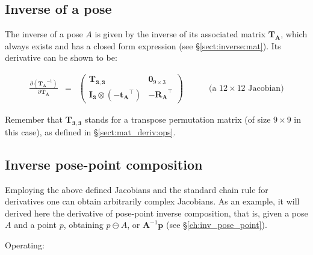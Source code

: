 \documentclass[a4paper,11pt]{report}
\begin{document}
\subsection{Inverse of a pose}

The inverse of a pose $A$ is given by the inverse of its associated matrix $\mathbf{T_A}$,
which always exists and has a closed form expression (see \S\ref{sect:inverse:mat}).
Its derivative can be shown to be:

\begin{eqnarray}
\label{eq:jac_dInv_A}
\frac{\partial \left( \mathbf{T_A} ^{-1} \right) }{\partial \mathbf{T_A} } &=&
\left(
\begin{array}{cc}
 \mathbf{T_{3,3}} & \mathbf{0}_{9 \times 3} \\
 \mathbf{I_3} \otimes (-\mathbf{t_A}^\top) & - \mathbf{R_A}^\top
\end{array}
\right)
\quad \quad \quad
\text{(a $12 \times 12$ Jacobian)}
\end{eqnarray}

Remember that $\mathbf{T_{3,3}}$ stands for a transpose permutation matrix (of size $9 \times 9$ in this case),
as defined in \S\ref{sect:mat_deriv:ops}.


\subsection{Inverse pose-point composition}

Employing the above defined Jacobians and the standard chain rule for derivatives one can
obtain arbitrarily complex Jacobians. As an example, it will derived here
the derivative of pose-point inverse composition, that is,
given a pose $A$ and a point $p$, obtaining $p \ominus A$, or $\mathbf{A}^{-1} \mathbf{p}$
(see \S\ref{ch:inv_pose_point}).

Operating:
\end{document}
